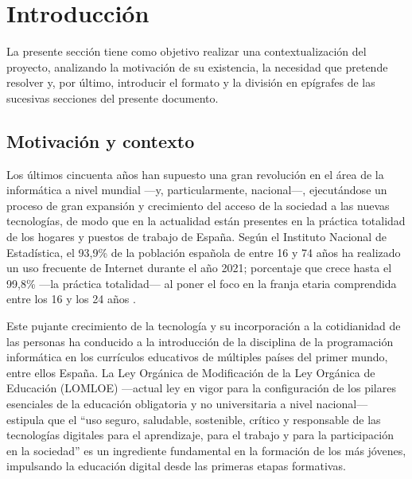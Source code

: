 \chapter{Introducción}
\label{sec:introduccion}

\setlength{\parskip}{0.75em}
\renewcommand{\baselinestretch}{1.25}
\setcounter{page}{1}

La presente sección tiene como objetivo realizar una contextualización del proyecto, analizando la motivación de su existencia, la necesidad que pretende resolver y, por último, introducir el formato y la división en epígrafes de las sucesivas secciones del presente documento.

\section{Motivación y contexto}
Los últimos cincuenta años han supuesto una gran revolución en el área de la informática a nivel mundial ---y, particularmente, nacional---, ejecutándose un proceso de gran expansión y crecimiento del acceso de la sociedad a las nuevas tecnologías, de modo que en la actualidad están presentes en la práctica totalidad de los hogares y puestos de trabajo de España.
Según el Instituto Nacional de Estadística, el 93,9\% de la población española de entre 16 y 74 años ha realizado un uso frecuente de Internet durante el año 2021; porcentaje que crece hasta el 99,8\% ---la práctica totalidad--- al poner el foco en la franja etaria comprendida entre los 16 y los 24 años \cite{INEMyH2021}.

Este pujante crecimiento de la tecnología y su incorporación a la cotidianidad de las personas ha conducido a la introducción de la disciplina de la programación informática en los currículos educativos de múltiples países del primer mundo, entre ellos España. La Ley Orgánica de Modificación de la Ley Orgánica de Educación (LOMLOE) ---actual ley en vigor para la configuración de los pilares esenciales de la educación obligatoria y no universitaria a nivel nacional--- estipula que el ``uso seguro, saludable, sostenible, crítico y responsable de las tecnologías digitales para el aprendizaje, para el trabajo y para la participación en la sociedad'' \cite{BOEMEFP2022} es un ingrediente fundamental en la formación de los más jóvenes, impulsando la educación digital desde las primeras etapas formativas.

